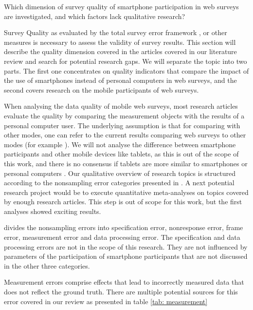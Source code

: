 Which dimension of survey quality of smartphone participation in web surveys are investigated, and which factors lack qualitative research?

Survey Quality as evaluated by the total survey error framework \cite{groves_total_2010}, or other measures is necessary to assess the validity of survey results. This section will describe the quality dimension covered in the articles covered in our literature review and search for potential research gaps. We will separate the topic into two parts. The first one concentrates on quality indicators that compare the impact of the use of smartphones instead of personal computers in web surveys, and the second covers research on the mobile participants of web surveys.

When analysing the data quality of mobile web surveys, most research articles evaluate the quality by comparing the measurement objects with the results of a personal computer user. The underlying assumption is that for comparing with other modes, one can refer to the current results comparing web surveys to other modes (for example \cite{manfreda_web_2008, ryan_survey_2020, evans_value_2018}). We will not analyse the difference between smartphone participants and other mobile devices like tablets, as this is out of the scope of this work, and there is no consensus if tablets are more similar to smartphones or personal computers \cite{couper_why_2017}. Our qualitative overview of research topics is structured according to the nonsampling error categories presented in \cite{biemer_total_2010}. A next potential research project would be to execute quantitative meta-analyses on topics covered by enough research articles. This step is out of scope for this work, but the first analyses showed exciting results. 

\cite{biemer_total_2010} divides the nonsampling errors into specification error, nonresponse error, frame error, measurement error and data processing error. The specification and data processing errors are not in the scope of this research. They are not influenced by parameters of the participation of smartphone participants that are not discussed in the other three categories.

Measurement errors comprise effects that lead to incorrectly measured data that does not reflect the ground truth. There are multiple potential sources for this error covered in our review as presented in table \ref{tab: measurement}

